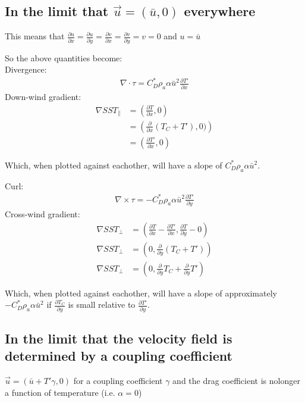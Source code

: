 \documentclass[12pt,a4paper]{article}
\newcommand{\dudx}{\frac{\partial u}{\partial x}}
\newcommand{\dudy}{\frac{\partial u}{\partial y}}
\newcommand{\dvdx}{\frac{\partial v}{\partial x}}
\newcommand{\dvdy}{\frac{\partial v}{\partial y}}
\newcommand{\dTdx}{\frac{\partial T}{\partial x}}
\newcommand{\dTdy}{\frac{\partial T}{\partial y}}
\newcommand{\dTpdx}{\frac{\partial T'}{\partial x}}
\newcommand{\dTpdy}{\frac{\partial T'}{\partial y}}
\begin{document}
\subsection{In the limit that $\vec{u} = (\bar{u},0)$ everywhere}\label{sec:A_constant}

This means that $\dudx = \dudy = \dvdx = \dvdy = v = 0$ and $u=\bar{u}$

So the above quantities become:\\
Divergence:
\begin{align*}
\nabla \cdot \tau = C_D^* \rho_a \alpha\bar{u}^2\dTpdx
\end{align*}
Down-wind gradient:
\begin{align*}
\nabla SST_{\parallel} &= \left( \dTdx , 0 \right) \\
&= \left( \frac{\partial}{\partial x}(T_C + T') , 0) \right)\\
&= \left( \dTpdx, 0 \right)
\end{align*}

Which, when plotted against eachother, will have a slope of $ C_D^* \rho_a \alpha\bar{u}^2$.\\
\vspace*{0.5in}

Curl:
\begin{align*}
\nabla \times \tau = -C_D^* \rho_a \alpha\bar{u}^2\dTpdy
\end{align*}
Cross-wind gradient:
\begin{align*}
\nabla SST_{\bot} &= \left(\dTdx- \dTpdx , \dTdy- 0 \right)\\
\nabla SST_{\bot} &= \left(0 , \frac{\partial}{\partial y}(T_C + T') \right)\\
\nabla SST_{\bot} &= \left(0 , \frac{\partial}{\partial y}T_C+ \frac{\partial}{\partial y}T' \right)
\end{align*}

Which, when plotted against eachother, will have a slope of approximately $ -C_D^* \rho_a \alpha\bar{u}^2$ if $\frac{\partial T_C}{\partial y}$ is small relative to $\dTpdy$.

\subsection{In the limit that the velocity field is determined by a coupling coefficient }\label{sec:A_uT}
 $\vec{u} = (\bar{u} + T' \gamma, 0)$ for a coupling coefficient $\gamma$ and the drag coefficient is nolonger a function of temperature (i.e. $\alpha = 0$)
\end{document}
